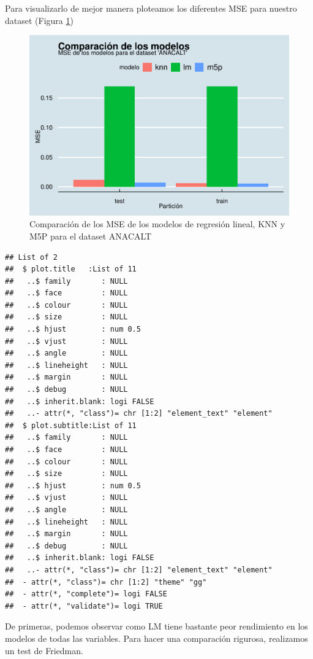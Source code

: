 \documentclass[
]{article}
\begin{document}
Para visualizarlo de mejor manera ploteamos los diferentes MSE para
nuestro dataset (Figura \ref{fig:mse_comp})

\begin{figure}

{\centering \includegraphics[width=0.75\linewidth]{anacalt-regresion_files/figure-latex/mse_comp-1} 

}

\caption{Comparación de los MSE de los modelos de regresión lineal, KNN y M5P para el dataset ANACALT}\label{fig:mse_comp}
\end{figure}

\begin{verbatim}
## List of 2
##  $ plot.title   :List of 11
##   ..$ family       : NULL
##   ..$ face         : NULL
##   ..$ colour       : NULL
##   ..$ size         : NULL
##   ..$ hjust        : num 0.5
##   ..$ vjust        : NULL
##   ..$ angle        : NULL
##   ..$ lineheight   : NULL
##   ..$ margin       : NULL
##   ..$ debug        : NULL
##   ..$ inherit.blank: logi FALSE
##   ..- attr(*, "class")= chr [1:2] "element_text" "element"
##  $ plot.subtitle:List of 11
##   ..$ family       : NULL
##   ..$ face         : NULL
##   ..$ colour       : NULL
##   ..$ size         : NULL
##   ..$ hjust        : num 0.5
##   ..$ vjust        : NULL
##   ..$ angle        : NULL
##   ..$ lineheight   : NULL
##   ..$ margin       : NULL
##   ..$ debug        : NULL
##   ..$ inherit.blank: logi FALSE
##   ..- attr(*, "class")= chr [1:2] "element_text" "element"
##  - attr(*, "class")= chr [1:2] "theme" "gg"
##  - attr(*, "complete")= logi FALSE
##  - attr(*, "validate")= logi TRUE
\end{verbatim}

De primeras, podemos observar como LM tiene bastante peor rendimiento en
los modelos de todas las variables. Para hacer una comparación rigurosa,
realizamos un test de Friedman.
\end{document}
